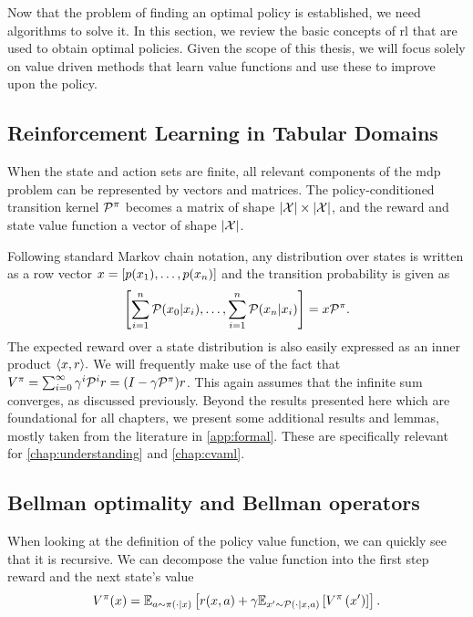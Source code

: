 
Now that the problem of finding an optimal policy is established, we need algorithms to solve it.
In this section, we review the basic concepts of \ac{rl} that are used to obtain optimal policies.
Given the scope of this thesis, we will focus solely on value driven methods that learn value functions and use these to improve upon the policy.

\subsection{Reinforcement Learning in Tabular Domains}

When the state and action sets are finite, all relevant components of the \ac{mdp} problem can be represented by vectors and matrices.
The policy-conditioned transition kernel $\P^\pi$ becomes a matrix of shape $|\X| \times |\X|$, and the reward and state value function a vector of shape $|\X|$.

Following standard Markov chain notation, any distribution over states is written as a row vector $\state = [p(\state_1),\dots, p(\state_n)]$ and the transition probability is given as $$\left[\sum_{i=1}^n \P(\state_0|\state_i), \dots, \sum_{i=1}^n \P(\state_n|\state_i)\right] = \state \P^\pi.$$
The expected reward over a state distribution is also easily expressed as an inner product $\langle \state,r\rangle.$
We will frequently make use of the fact that $V^\pi = \sum_{i=0}^\infty \gamma^i \P^i r = (I - \gamma \P^\pi)r$.
This again assumes that the infinite sum converges, as discussed previously.
Beyond the results presented here which are foundational for all chapters, we present some additional results and lemmas, mostly taken from the literature in \autoref{app:formal}.
These are specifically relevant for \autoref{chap:understanding} and \autoref{chap:cvaml}.

\subsection{Bellman optimality and Bellman operators}

When looking at the definition of the policy value function, we can quickly see that it is recursive.
We can decompose the value function into the first step reward and the next state's value $$V^\pi(\state) = \mathbb{E}_{a\sim\pi(\cdot|\state)}\left[r(\state,a) + \gamma \mathbb{E}_{\state'\sim\P(\cdot|\state,a)}\left[V^\pi\left(\state'\right)\right]\right].$$

